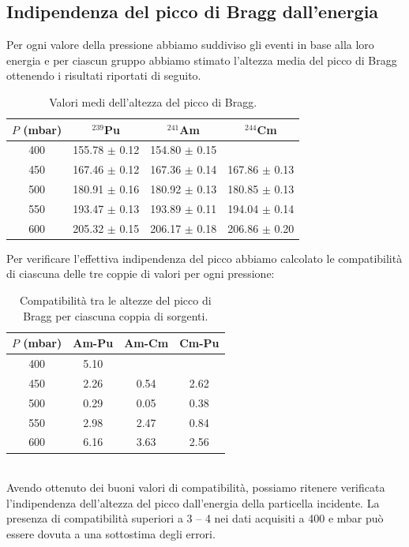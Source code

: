 \documentclass[italian,a4paper]{article}
\newcommand{\Am}{$^{241}$Am}
\newcommand{\Cm}{$^{244}$Cm}
\newcommand{\Pu}{$^{239}$Pu}
\begin{document}
\subsection{Indipendenza del picco di Bragg dall'energia}
Per ogni valore della pressione abbiamo suddiviso gli eventi in base alla loro energia e per ciascun gruppo abbiamo stimato l'altezza media del picco di Bragg ottenendo i risultati riportati di seguito.
\begin{table}[h!]\centering
\begin{tabular}{*4c}
$P$ (mbar)&		\Pu&			\Am&			\Cm\\\hline
400&			155.78 $\pm$ 0.12&    	154.80 $\pm$ 0.15&		\\
450&			167.46 $\pm$ 0.12&    	167.36 $\pm$ 0.14&    167.86 $\pm$ 0.13\\
500&			180.91 $\pm$ 0.16&    	180.92 $\pm$ 0.13&    180.85 $\pm$ 0.13\\
550&			193.47 $\pm$ 0.13&    	193.89 $\pm$ 0.11&    194.04 $\pm$ 0.14\\
600&			205.32 $\pm$ 0.15&    	206.17 $\pm$ 0.18&    206.86 $\pm$ 0.20
\end{tabular}
\caption{Valori medi dell'altezza del picco di Bragg.}
\end{table}
\newpage
Per verificare l'effettiva indipendenza del picco abbiamo calcolato le compatibilit\`a di ciascuna delle tre coppie di valori per ogni pressione:
\begin{table}[h!]\centering
\begin{tabular}{*4c}
$P$ (mbar)&	Am-Pu&	Am-Cm&		Cm-Pu\\\hline
400&		5.10&	&		\\
450&		2.26&	0.54&		2.62\\
500&		0.29&	0.05&		0.38\\
550&		2.98&	2.47&		0.84\\
600&		6.16&	3.63&		2.56
\end{tabular}
\caption{Compatibilit\`a tra le altezze del picco di Bragg per ciascuna coppia di sorgenti.}
\end{table}\\
Avendo ottenuto dei buoni valori di compatibilit\`a, possiamo ritenere verificata l'indipendenza dell'altezza del picco dall'energia della particella incidente. La presenza di compatibilit\`a superiori a 3 -- 4 nei dati acquisiti a 400 e \unit[600]{mbar} pu\`o essere dovuta a una sottostima degli errori.
\end{document}
